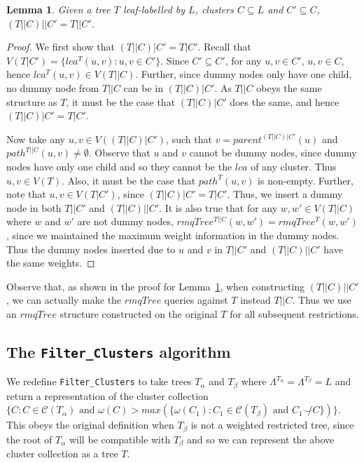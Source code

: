 \documentclass[final,1p,times]{elsarticle}
\newcommand{\compatible}{\smile}
\newcommand{\leafset}{\Lambda}
\newcommand{\weight}{\omega}
\newcommand{\TA}{T_\alpha}
\newcommand{\TB}{T_\beta}
\newtheorem{lemma}[theorem]{Lemma}
\begin{document}
    \begin{lemma}
        \label{lem:furtherrestriction}
        Given a tree $T$ leaf-labelled by $L$, clusters $C \subseteq L$ and $C' \subseteq C$, $(T||C)||C' = T||C'$.
    \end{lemma}
        \begin{proof}
            We first show that $(T||C)|C' = T|C'$. Recall that $V(T|C') = \{lca^{T}(u, v) : u, v \in C'\}$. Since $C' \subseteq C'$, for any $u, v \in C'$, $u, v \in C$, hence $lca^{T}(u, v) \in V(T||C)$. Further, since dummy nodes only have one child, no dummy node from $T||C$ can be in $(T||C)|C'$. As $T||C$ obeys the same structure as $T$, it must be the case that $(T||C)|C'$ does the same, and hence $(T||C)|C' = T|C'$.

            Now take any $u, v \in V((T||C)|C')$, such that $v = parent^{(T||C)|C'}(u)$ and $path^{T||C}(u, v) \neq \emptyset$. Observe that $u$ and $v$ cannot be dummy nodes, since dummy nodes have only one child and so they cannot be the $lca$ of any cluster. Thus $u, v \in V(T)$. Also, it must be the case that $path^{T}(u, v)$ is non-empty. Further, note that $u, v \in V(T|C')$, since $(T||C)|C' = T|C'$. Thus, we insert a dummy node in both $T||C'$ and $(T||C)||C'$. It is also true that for any $w, w' \in V(T||C)$ where $w$ and $w'$ are not dummy nodes, $rmqTree^{T||C}(w, w') = rmqTree^{T}(w, w')$, since we maintained the maximum weight information in the dummy nodes. Thus the dummy nodes inserted due to $u$ and $v$ in $T||C'$ and $(T||C)||C'$ have the same weights.
        \end{proof}

    Observe that, as shown in the proof for Lemma~\ref{lem:furtherrestriction}, when constructing $(T||C)||C'$, we can actually make the $rmqTree$ queries against $T$ instead $T||C$. Thus we use an $rmqTree$ structure constructed on the original $T$ for all subsequent restrictions.

    \subsection{The \texttt{Filter\_Clusters} algorithm}
    \label{subsec:filterclusters}

    We redefine \texttt{Filter\_Clusters} to take trees $\TA$ and $\TB$ where $\leafset^{\TA} = \leafset^{\TB} = L$ and return a representation of the cluster collection $\{C : C \in \mathcal{C}(\TA) \text{ and } \weight(C) > max(\{\weight(C_1) : C_1 \in \mathcal{C}(\TB) \text{ and } C_1 \not\compatible C\})\}$. This obeys the original definition when $\TB$ is not a weighted restricted tree, since the root of $\TA$ will be compatible with $\TB$ and so we can represent the above cluster collection as a tree $T$.
\end{document}
